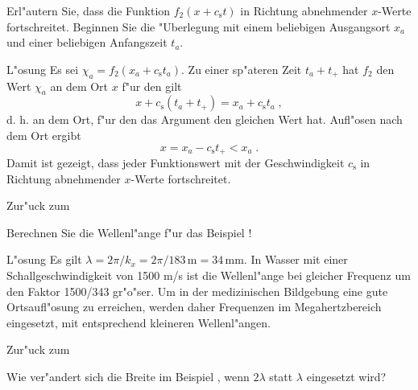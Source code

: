 \begin{MExercises}
\begin{MExercise}
Erl"autern Sie, dass die Funktion $f_2(x+c_\mathrm{s}t)$ in Richtung abnehmender $x$-Werte fortschreitet. Beginnen Sie die "Uberlegung mit einem beliebigen Ausgangsort $x_a$ und einer beliebigen Anfangszeit $t_a$.

\begin{MHint}{L"osung}
Es sei $\chi_a = f_2(x_a+c_\mathrm{s}t_a)$. Zu einer sp"ateren Zeit $t_a+t_+$ hat $f_2$ den Wert $\chi_a$ an dem Ort $x$ f"ur den gilt
$$
  x+c_\mathrm{s}(t_a+t_+)=x_a+c_\mathrm{s}t_a\;,
$$
d. h. an dem Ort, f"ur den das Argument den gleichen Wert hat. Aufl"osen nach dem Ort ergibt
$$
  x=x_a-c_\mathrm{s}t_+<x_a\;.
$$
Damit ist gezeigt, dass jeder Funktionswert mit der Geschwindigkeit $c_\mathrm{s}$ in Richtung abnehmender $x$-Werte fortschreitet. 
\end{MHint}

Zur"uck zum 
\end{MExercise}

\begin{MExercise}
Berechnen Sie die Wellenl"ange f"ur das Beispiel !

\begin{MHint}{L"osung} Es gilt $\lambda = 2\pi/k_x = 2\pi/183\,\mathrm{m} = 34\,\mathrm{mm}$. In Wasser mit einer Schallgeschwindigkeit von 1500 m/s ist die Wellenl"ange bei gleicher Frequenz um den Faktor 1500/343 gr"o"ser. Um in der medizinischen Bildgebung eine gute Ortsaufl"osung zu erreichen, werden daher Frequenzen im Megahertzbereich eingesetzt, mit entsprechend kleineren Wellenl"angen. \end{MHint}

Zur"uck zum 
\end{MExercise}

\begin{MExercise}
Wie ver"andert sich die Breite im Beispiel , wenn $2\lambda$ statt $\lambda$ eingesetzt wird?


\end{MExercise}
\end{MExercises}
